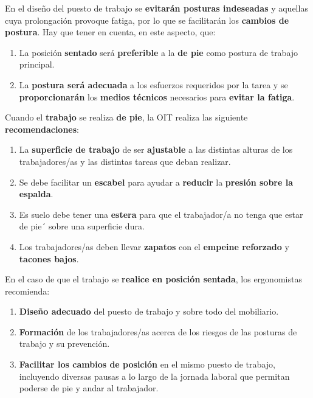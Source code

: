 En el diseño del puesto de trabajo se \textbf{evitarán posturas indeseadas} y aquellas cuya prolongación provoque fatiga, por lo que se facilitarán los \textbf{cambios de postura}. Hay que tener en cuenta, en este aspecto, que:

\begin{enumerate}
    \item La posición \textbf{sentado} será \textbf{preferible} a la \textbf{de pie} como postura de trabajo principal.
    \item La \textbf{postura será adecuada} a los esfuerzos requeridos por la tarea y se \textbf{proporcionarán} los \textbf{medios técnicos} necesarios para \textbf{evitar la fatiga}.
\end{enumerate}

Cuando el \textbf{trabajo} se realiza \textbf{de pie}, la OIT realiza las siguiente \textbf{recomendaciones}:

\begin{enumerate}
    \item La \textbf{superficie de trabajo} de ser \textbf{ajustable} a las distintas alturas de los trabajadores/as y las distintas tareas que deban realizar.
    \item Se debe facilitar un \textbf{escabel} para ayudar a \textbf{reducir} la \textbf{presión sobre la espalda}.
    \item Es suelo debe tener una \textbf{estera} para que el trabajador/a no tenga que estar de pie´ sobre una superficie dura.
    \item Los trabajadores/as deben llevar \textbf{zapatos} con el \textbf{empeine reforzado} y \textbf{tacones bajos}.
\end{enumerate}

En el caso de que el trabajo se \textbf{realice en posición sentada}, los ergonomistas recomienda:

\begin{enumerate}
    \item \textbf{Diseño adecuado} del puesto de trabajo y sobre todo del mobiliario.
    \item \textbf{Formación} de los trabajadores/as acerca de los riesgos de las posturas de trabajo y su prevención.
    \item \textbf{Facilitar los cambios de posición} en el mismo puesto de trabajo, incluyendo diversas pausas a lo largo de la jornada laboral que permitan poderse de pie y andar al trabajador.
\end{enumerate}

